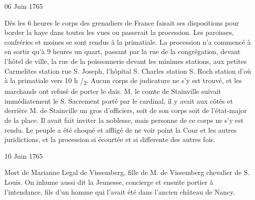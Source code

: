                      \begin{diary}{06 Juin 1765}{}

                         Dès les 6 heures le corps des
                           grenadiers de
                           France faisait ses dispositions pour border la
                           haye dans toutes les vues ou passerait la
                           procession. Les paroisses, confréries et moines
                           se sont rendus à la
                              primatiale. La procession
                           n'a commencé à en sortir qu'à 9 heures un
                           quart, passant par la rue
                              de la congrégation,
                           devant l'hôtel de ville,
                              la rue de la
                              poissonnerie
                           devant les minimes
                              stations, aux
                              petites Carmelites
                              station rue S. Joseph, l'hôpital S. Charles station
                           S. Roch station d'où à la
                              primatiale vers 10 h /\textsubscript{2}.
                           Aucun corps de judicature
                           ne s'y est trouvé,
                           et les marchands ont refusé de porter le dais.
                           M. le comte de Stainville
                           suivait immédiatement
                           le S. Sacrement porté par le cardinal, il y
                           avait
                           aux côtés et derrière M. de
                              Stainville un gros
                           d'officiers, soit de son corps soit de l’état-major
                           de la place. Il avait fait inviter la noblesse,
                           mais personne de ce corps ne s'y est rendu.
                           Le peuple a été choqué et affligé de ne voir
                           point la Cour et les autres juridictions, et la procession si écourtée et si
                           differente des
                           autres fois. \bigskip


                     \end{diary}
                     \begin{diary}{10 Juin 1765}{}

                         Mort de Marianne Legal de Vissemberg,
                           fille de M. de Vissemberg
                           chevalier de S. Louis.
                           On inhume aussi
                           dit la Jeunesse, concierge et
                           ensuite portier
                           à l'intendance, fils d'un homme
                           qui l'avait
                           été dans l'ancien château de Nancy. \bigskip


                     \end{diary}
